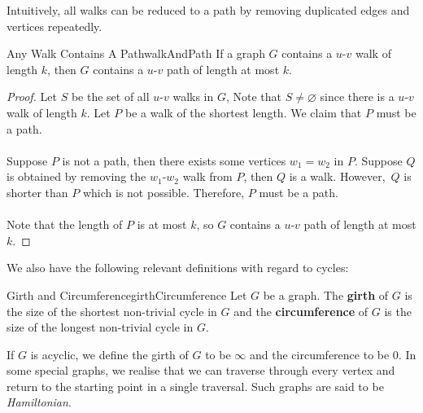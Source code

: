 \documentclass[math, code]{amznotes}
\theoremstyle{remark}
\begin{document}
Intuitively, all walks can be reduced to a path by removing duplicated edges and vertices repeatedly.
\begin{probox}{Any Walk Contains A Path}{walkAndPath}
    If a graph $G$ contains a $u$-$v$ walk of length $k$, then $G$ contains a $u$-$v$ path of length at most $k$.
    \tcblower
    \begin{proof}
        Let $S$ be the set of all $u$-$v$ walks in $G$, Note that $S \neq \varnothing$ since there is a $u$-$v$ walk of length $k$. Let $P$ be a walk of the shortest length. We claim that $P$ must be a path.
        \\\\
        Suppose $P$ is not a path, then there exists some vertices $w_1 = w_2$ in $P$. Suppose $Q$ is obtained by removing the $w_1$-$w_2$ walk from $P$, then $Q$ is a walk. However,~$Q$ is shorter than $P$ which is not possible. Therefore, $P$ must be a path.
        \\\\
        Note that the length of $P$ is at most $k$, so $G$ contains a $u$-$v$ path of length at most $k$.
    \end{proof}
\end{probox}

We also have the following relevant definitions with regard to cycles:
\begin{dfnbox}{Girth and Circumference}{girthCircumference}
    Let $G$ be a graph. The {\color{red} \textbf{girth}} of $G$ is the size of the shortest non-trivial cycle in $G$ and the {\color{red} \textbf{circumference}} of $G$ is the size of the longest non-trivial cycle in $G$.
\end{dfnbox}
If $G$ is acyclic, we define the girth of $G$ to be $\infty$ and the circumference to be $0$. In some special graphs, we realise that we can traverse through every vertex and return to the starting point in a single traversal. Such graphs are said to be \textit{Hamiltonian}.
\end{document}

